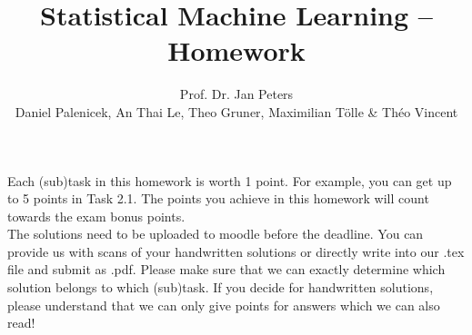 \documentclass[
	ngerman,
	points=true,%
    solution=true,
    accentcolor=9c,
    colorbacktitle
	]{tudaexercise}
\begin{document}
\title[Homework 2/4]{Statistical Machine Learning -- Homework}
\author{Prof. Dr. Jan Peters \\ Daniel Palenicek, An Thai Le, Theo Gruner, Maximilian Tölle \& Théo Vincent}

\maketitle
Each (sub)task in this homework is worth 1 point. For example, you can get up to 5 points in Task 2.1. The points you achieve in this homework will count towards the exam bonus points. \\
The solutions need to be uploaded to moodle before the deadline. You can provide us with scans of your handwritten solutions or directly write into our .tex file and submit as .pdf. Please make sure that we can exactly determine which solution belongs to which (sub)task. If you decide for handwritten solutions, please understand that we can only give points for answers which we can also read! 
\end{document}
